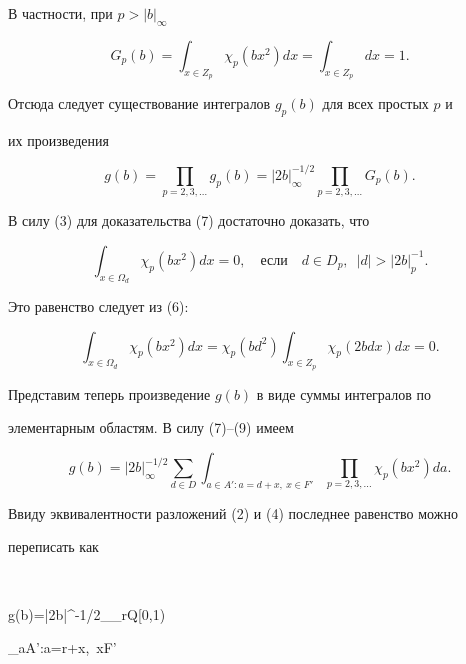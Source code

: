 В частности, при $p>|b|_\infty$ 


\begin{equation} 


G_p(b)=\int_{x\in Z_p}\chi_p(b x^2)d x= 


\int_{x\in Z_p}d x=1. 


\end{equation} 


Отсюда следует существование интегралов $g_p(b)$ для всех простых $p$ и 


их произведения 


$$ 


g(b)=\prod_{p=2,3,\dotsc}g_p(b)=|2b|^{-1/2}_\infty 


\prod_{p=2,3,\dotsc}G_p(b). 


$$ 


В силу (3) для доказательства (7) достаточно доказать, что 


\begin{equation} 


\int_{x\in\Omega_d}\chi_p(b x^2)d x=0,\quad 


\text{если} 


\quad d\in D_p,\ \; |d|>|2b|^{-1}_p. 


\end{equation} 


Это равенство следует из (6): 


$$ 


\int_{x\in\Omega_d}\chi_p(b x^2)d x=\chi_p(b d^2) 


\int_{x\in Z_p}\chi_p(2b d x)dx=0. 


$$ 


Представим теперь произведение $g(b)$ в виде суммы интегралов по 


элементарным областям. В силу (7)--(9) имеем 


$$ 


g(b)=|2b|^{-1/2}_\infty\sum_{d\in D} 


\int_{a\in A':a=d+x,\ x\in F'} 


\prod_{p=2,3,\dotsc}\chi_p(b x^2)da.


$$ 


Ввиду эквивалентности разложений (2) и (4) последнее равенство можно 


переписать как 


$$ 


g(b)=|2b|^{-1/2}_\infty\sum_{r\in Q\cap[0,1)} 


\int_{a\in A':a=r+x,\ x\in F'} 


